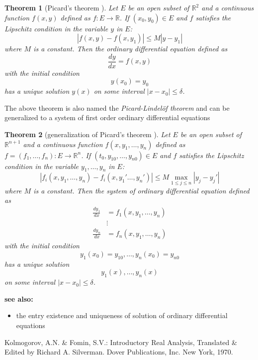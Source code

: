 \documentclass[12pt]{article}
\newtheorem{thm}{Theorem}
\begin{document}
\begin{thm}[Picard's theorem \cite{KF}]
Let $E$ be an open subset of $\mathbb{R}^2$ and a continuous function $f(x,y)$ defined as $f\colon E \to \mathbb{R}$.  If $(x_0,y_0)\in E$ and $f$ satisfies the Lipschitz condition in the variable $y$ in $E$:
$$|f(x,y)-f(x,y_1)| \leq M| y-y_1|$$
where $M$ is a constant.  Then the ordinary differential equation defined as
$$\frac{dy}{dx} = f(x,y)$$
with the initial condition
$$y(x_0) = y_0$$
has a unique solution $y(x)$ on some interval $|x- x_0| \leq\delta$.
\end{thm}

The above theorem is also named the \emph{Picard-Lindel\"of theorem} and can be generalized to a system of first order ordinary differential equations

\begin{thm}[generalization of Picard's theorem \cite{KF}]
Let $E$ be an open subset of $\mathbb{R}^{n+1}$ and a continuous function $f(x,y_1,\ldots,y_n)$ defined as $f=(f_1,\ldots,f_n)\colon E \to \mathbb{R}^n$.  If $(t_0,y_{10},\ldots,y_{n0})\in E$ and $f$ satisfies the Lipschitz condition in the variable $y_1,\ldots,y_n$ in $E$:
$$|f_i(x,y_1,\dots,y_n)-f_i(x,y_1'\ldots,y_n')| \leq M \max_{1\leq j\leq n}| y_j-y_j'|$$
where $M$ is a constant.  Then the system of ordinary differential equation defined as
\begin{align*}
\frac{dy_1}{dx} & =  f_1(x,y_1,\ldots,y_n)\\
& \vdots \\
\frac{dy_n}{dx} & =  f_n(x,y_1,\ldots,y_n)
\end{align*}
with the initial condition
$$y_1(x_0) = y_{10},\ldots, y_n(x_0) = y_{n0}$$
has a unique solution
$$y_1(x) ,\ldots, y_n(x)$$
on some interval $|x- x_0| \leq\delta$.
\end{thm}

\textbf{see also:}
\begin{itemize}
\item the entry existence and uniqueness of solution of ordinary differential equations
\end{itemize}

\begin{thebibliography}{1}
 Kolmogorov, A.N. \& Fomin, S.V.: Introductory Real Analysis, Translated \& Edited by Richard A. Silverman. Dover Publications, Inc. New York, 1970.
\end{thebibliography}
\end{document}
